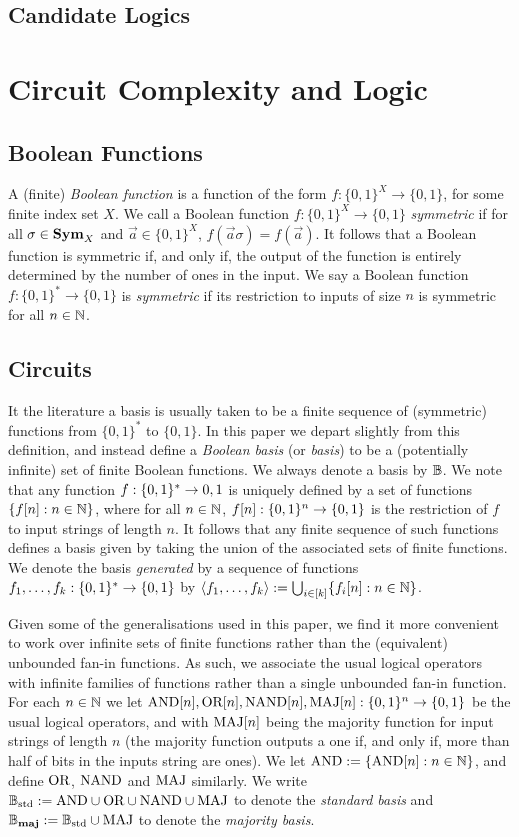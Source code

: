 \documentclass[../main/thesis.tex]{subfiles}
\begin{document}
\subsection{Candidate Logics}


\section{Circuit Complexity and Logic}
\subsection{Boolean Functions}
A (finite) \emph{Boolean function} is a function of the form $f: \{0,1\}^X
\rightarrow \{0,1\}$, for some finite index set $X$. We call a Boolean function
$f: \{0,1\}^X \rightarrow \{0,1\}$ \emph{symmetric} if for all $\sigma \in
\text{\textbf{Sym}}_X$ and $\vec{a} \in \{0,1\}^X$, $f (\vec{a} \sigma) = f(\vec{a})$. It
follows that a Boolean function is symmetric if, and only if, the output of the
function is entirely determined by the number of ones in the input. We say a
Boolean function $f : \{0,1\}^{*} \rightarrow \{0,1\}$ is \emph{symmetric} if
its restriction to inputs of size $n$ is symmetric for all $n \in \mathbb{N}$.

\subsection{Circuits}

It the literature a basis is usually taken to be a finite sequence of
(symmetric) functions from $\{0,1\}^*$ to $\{0,1\}$. In this paper we depart
slightly from this definition, and instead define a \emph{Boolean basis} (or
\emph{basis}) to be a (potentially infinite) set of finite Boolean functions. We
always denote a basis by $\mathbb{B}$. We note that any function $f:\{0,1\}^* \rightarrow
{0,1}$ is uniquely defined by a set of functions $\{f[n] : n \in \mathbb{N}\}$, where
for all $n \in \mathbb{N}$, $f[n]:\{0,1\}^n \rightarrow \{0,1\}$ is the restriction of $f$ to
input strings of length $n$. It follows that any finite sequence of such
functions defines a basis given by taking the union of the associated sets of
finite functions. We denote the basis \emph{generated} by a sequence of
functions $f_1, \ldots, f_k : \{0,1\}^* \rightarrow \{0,1\}$ by $\langle f_1, \ldots,
f_k \rangle := \bigcup_{i \in [k]} \{f_i[n] : n \in \mathbb{N}\}$.

Given some of the generalisations used in this paper, we find it more convenient
to work over infinite sets of finite functions rather than the (equivalent)
unbounded fan-in functions. As such, we associate the usual logical operators
with infinite families of functions rather than a single unbounded fan-in
function. For each $n \in \mathbb{N}$ we let $\text{\upshape AND}[n], \text{\upshape OR}[n], \text{\upshape NAND}[n], \text{\upshape MAJ}[n] :
\{0,1\}^n \rightarrow \{0,1\}$ be the usual logical operators, and with
$\text{\upshape MAJ}[n]$ being the majority function for input strings of length $n$ (the
majority function outputs a one if, and only if, more than half of bits in the
inputs string are ones). We let $\text{\upshape AND} := \{\text{\upshape AND}[n] : n \in \mathbb{N}\}$, and define
$\text{\upshape OR}$, $\text{\upshape NAND}$ and $\text{\upshape MAJ}$ similarly. We write $\mathbb{B}_{\text{std}} := \text{\upshape AND} \cup \text{\upshape OR} \cup \text{\upshape NAND}
\cup \text{\upshape MAJ}$ to denote the \emph{standard basis} and $\mathbb{B}_{\text{\textbf{maj}}} := \mathbb{B}_{\text{std}} \cup \text{\upshape MAJ}$ to
denote the \emph{majority basis}.
\end{document}
